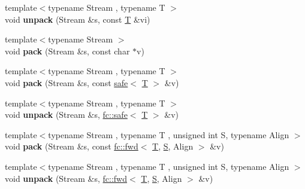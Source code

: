 \begin{DoxyCompactItemize}
\item 
\mbox{\label{namespacefc_1_1raw_a234f37e68ae495cf1fae7de03b0c6b23}} 
{\footnotesize template$<$typename Stream , typename T $>$ }\\void {\bfseries unpack} (Stream \&s, const \mbox{\hyperlink{struct_t}{T}} \&vi)
\item 
\mbox{\label{namespacefc_1_1raw_a134fe9acb5ab1bd68a553946f14ffd4f}} 
{\footnotesize template$<$typename Stream $>$ }\\void {\bfseries pack} (Stream \&s, const char $\ast$v)
\item 
\mbox{\label{namespacefc_1_1raw_a26d0eb6b1a5f7322e169b18d87491e55}} 
{\footnotesize template$<$typename Stream , typename T $>$ }\\void {\bfseries pack} (Stream \&s, const \mbox{\hyperlink{structfc_1_1safe}{safe}}$<$ \mbox{\hyperlink{struct_t}{T}} $>$ \&v)
\item 
\mbox{\label{namespacefc_1_1raw_ab406e5a6a27a4ccbedd947f9b1021b6a}} 
{\footnotesize template$<$typename Stream , typename T $>$ }\\void {\bfseries unpack} (Stream \&s, \mbox{\hyperlink{structfc_1_1safe}{fc\+::safe}}$<$ \mbox{\hyperlink{struct_t}{T}} $>$ \&v)
\item 
\mbox{\label{namespacefc_1_1raw_a4fa37dfea460d44b369c6abc49350366}} 
{\footnotesize template$<$typename Stream , typename T , unsigned int S, typename Align $>$ }\\void {\bfseries pack} (Stream \&s, const \mbox{\hyperlink{classfc_1_1fwd}{fc\+::fwd}}$<$ \mbox{\hyperlink{struct_t}{T}}, \mbox{\hyperlink{struct_s}{S}}, Align $>$ \&v)
\item 
\mbox{\label{namespacefc_1_1raw_a18414ce7f1d41071c9774d36c95a6347}} 
{\footnotesize template$<$typename Stream , typename T , unsigned int S, typename Align $>$ }\\void {\bfseries unpack} (Stream \&s, \mbox{\hyperlink{classfc_1_1fwd}{fc\+::fwd}}$<$ \mbox{\hyperlink{struct_t}{T}}, \mbox{\hyperlink{struct_s}{S}}, Align $>$ \&v)
\item 
\mbox{\label{namespacefc_1_1raw_a702d0f06862d52e26c70940fa052e387}} 

\end{DoxyCompactItemize}
